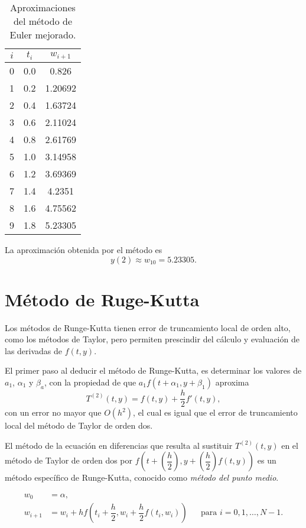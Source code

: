 \begin{exerciseT}
{\begin{table}[H]
\begin{tabular}{ccc}
			\toprule
			$i$ & $t_i$ & $w_{i+1}$\\
			\midrule
			0 & 0.0 & 0.826\\
			1 & 0.2 & 1.20692\\
			2 & 0.4 & 1.63724\\
			3 & 0.6 & 2.11024\\
			4 & 0.8 & 2.61769\\
			5 & 1.0 & 3.14958\\
			6 & 1.2 & 3.69369\\
			7 & 1.4 & 4.2351\\
			8 & 1.6 & 4.75562\\
			9 & 1.8 & 5.23305\\
			\bottomrule
		\end{tabular}
		\caption{Aproximaciones del método de Euler mejorado.}
	\end{table}
	
La aproximación obtenida por el método es \[y(2) \approx w_{10} = 5.23305.\]	
}\end{exerciseT}

\section{Método de Ruge-Kutta}
Los métodos de Runge-Kutta tienen error de truncamiento local de orden alto, como los métodos de Taylor, pero permiten prescindir 
del cálculo y evaluación de las derivadas de $f(t,y)$. 

El primer paso al deducir el método de Runge-Kutta, es determinar los valores de $a_1$, $\alpha_1$ y $\beta_a$, con la propiedad de 
que $a_1f(t+\alpha_1, y+\beta_1)$ aproxima
\[ T^{(2)}(t,y) = f(t,y) + \dfrac{h}{2}f'(t,y), \]
con un error no mayor que $O(h^2)$, el cual es igual que el error de truncamiento local del método de Taylor de orden dos.

El método de la ecuación en diferencias que resulta al sustituir $T^{(2)}(t,y)$ en el método de Taylor de orden dos por 
$f\left(t+\left(\dfrac{h}{2}\right), y + \left(\dfrac{h}{2}\right)f(t,y) \right)$ es un método específico de Runge-Kutta, conocido 
como \textit{método del punto medio}.

\begin{definition}
	\begin{align*}
		w_0 &= \alpha,\\
		w_{i+1} &= w_i + hf\left(t_i + \dfrac{h}{2}, w_i + \dfrac{h}{2}f(t_i,w_i) \right) && \mbox{para } i=0,1,\dots,N-1.
	\end{align*}
\end{definition}

